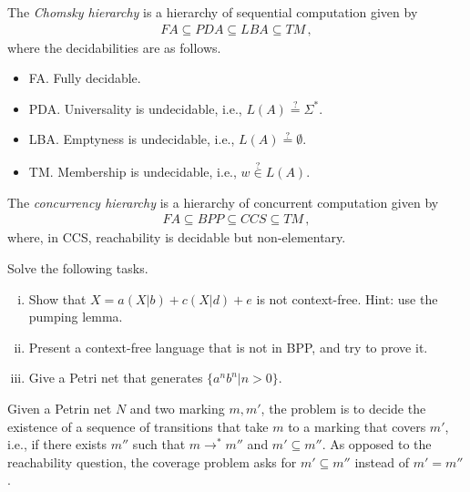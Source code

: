 \begin{definition}
	The \emph{Chomsky hierarchy} is a hierarchy of sequential computation given by
 \begin{align*}
     FA 
			\subseteq PDA
			\subseteq LBA
			\subseteq TM \,,
 \end{align*}
	where the decidabilities are as follows.
 \begin{itemize}
        \item FA. Fully decidable.
		\item PDA. Universality is undecidable, i.e., $L(A) \stackrel{?}{=} \Sigma^*$.
		\item LBA. Emptyness is undecidable, i.e., $L(A) \stackrel{?}{=} \emptyset$.
		\item TM. Membership is undecidable, i.e., $w \stackrel{?}{\in} L(A)$.
 \end{itemize}
\end{definition}

\begin{definition} 
	The \emph{concurrency hierarchy} is a hierarchy of concurrent computation given by
 \begin{align*}
     FA 
			\subseteq BPP
			\subseteq CCS
			\subseteq TM \,,
 \end{align*}
	where, in CCS, reachability is decidable but non-elementary.
\end{definition}


\begin{exercise}
    Solve the following tasks.
    \begin{enumerate}[(i)]
      \item Show that $X = a (X | b) + c (X | d) + e$ is not context-free.
		Hint: use the pumping lemma.

		\item Present a context-free language that is not in BPP, and try to prove it. 

    		\item Give a Petri net that generates $\{ a^n b^n | n > 0 \}$.
    \end{enumerate}
\end{exercise}


\begin{definition}
	Given a Petrin net $N$ and two marking $m, m'$, the problem is to decide the existence of a sequence of transitions that take $m$ to a marking that covers $m'$, i.e., if there exists $m''$ such that $m \to^* m''$ and $m' \subseteq m''$.
     As opposed to the reachability question, the coverage problem asks for $m' \subseteq m''$ instead of $m' = m''$.
\end{definition}


